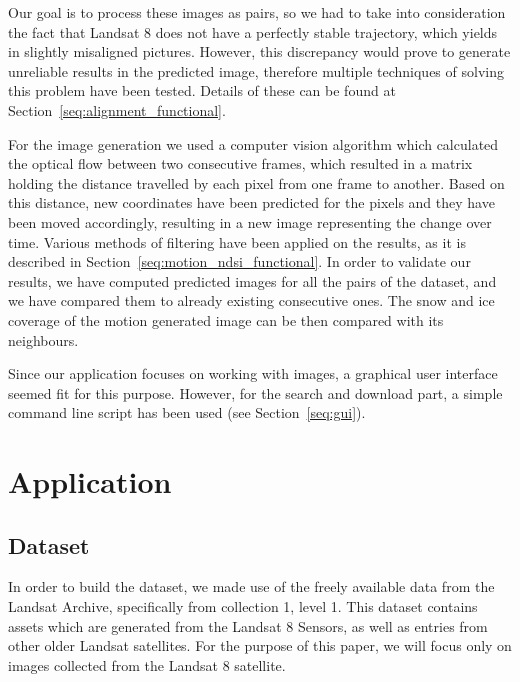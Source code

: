 \documentclass[12pt, a4paper]{report}
\begin{document}
	\par Our goal is to process these images as pairs, so we had to take into consideration the fact that Landsat 8 does not have a perfectly stable trajectory, which yields in slightly misaligned pictures. However, this discrepancy would prove to generate unreliable results in the predicted image, therefore multiple techniques of solving this problem have been tested. Details of these can be found at Section~\ref{seq:alignment_functional}.

	\par For the image generation we used a computer vision algorithm which calculated the optical flow between two consecutive frames, which resulted in a matrix holding the distance travelled by each pixel from one frame to another. Based on this distance, new coordinates have been predicted for the pixels and they have been moved accordingly, resulting in a new image representing the change over time. Various methods of filtering have been applied on the results, as it is described in Section~\ref{seq:motion_ndsi_functional}. In order to validate our results, we have computed predicted images for all the pairs of the dataset, and we have compared them to already existing consecutive ones. The snow and ice coverage of the motion generated image can be then compared with its neighbours.

	\par Since our application focuses on working with images, a graphical user interface seemed fit for this purpose. However, for the search and download part, a simple command line script has been used (see Section~\ref{seq:gui}).
	
	\newpage{}
	
	\chapter{Application}
	\section{Dataset}

	\par In order to build the dataset, we made use of the freely available data from the Landsat Archive, specifically from collection 1, level 1. This dataset contains assets which are generated from the Landsat 8 Sensors, as well as entries from other older Landsat satellites. For the purpose of this paper, we will focus only on images collected from the Landsat 8 satellite.
	
\end{document}
